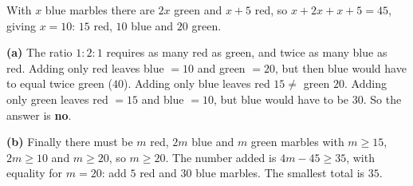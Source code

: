 With $x$ blue marbles there are $2x$ green and $x+5$ red, so $x+2x+x+5=45$, giving $x=10$: $15$ red, $10$ blue and $20$ green.

\textbf{(a)} The ratio $1:2:1$ requires as many red as green, and twice as many blue as red. Adding only red leaves blue $=10$ and green $=20$, but then blue would have to equal twice green ($40$). Adding only blue leaves red $15\ne$ green $20$. Adding only green leaves red $=15$ and blue $=10$, but blue would have to be $30$. So the answer is \textbf{no}.

\textbf{(b)} Finally there must be $m$ red, $2m$ blue and $m$ green marbles with $m\ge15$, $2m\ge10$ and $m\ge20$, so $m\ge20$. The number added is $4m-45\ge35$, with equality for $m=20$: add $5$ red and $30$ blue marbles. The smallest total is $\boxed{35}$.
